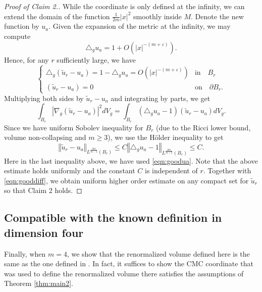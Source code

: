 \documentclass{amsart}
\newcommand{\norm}[1]{\left\Vert#1\right\Vert}
\newcommand{\abs}[1]{\left\vert#1\right\vert}
\numberwithin{equation}{section}
\begin{document}
\begin{proof}
	[Proof of Claim 2.]
	While the coordinate is only defined at the infinity, we can extend the domain of the function $\frac{1}{2m}\abs{x}^2$ smoothly inside $M$. Denote the new function by $u_a$. Given the expansion of the metric at the infinity, we may compute
	\begin{equation}
		\label{eqn:goodua}
		\triangle_g u_a = 1 + O(\abs{x}^{-(m+\varepsilon)}).
	\end{equation}
	Hence, for any $r$ sufficiently large, we have
	\begin{equation}
		\label{eqn:gooddiff}
		\begin{cases}
			\triangle_g (\tilde u_r- u_a) = 1- \triangle_g u_a = O(\abs{x}^{-(m+\varepsilon)}) & \text{in} \quad B_r \\
			(\tilde u_r-u_a) = 0 & \text{on} \quad \partial B_r.
		\end{cases}	
	\end{equation}
	Multiplying both sides by $\tilde{u}_r - u_a$ and integrating by parts, we get
	\[
		\int_{B_r} \abs{\nabla_g (\tilde{u}_r -u_a)}^2 dV_g = \int_{B_r} (\triangle_g u_a-1) (\tilde{u}_r-u_a)dV_g.
	\]
	Since we have uniform Sobolev inequality for $B_r$ (due to the Ricci lower bound, volume non-collapsing and $m\geq 3$), we use the H\"older inequality to get
	\[
		\norm{\tilde{u}_r -u_a}_{L^{\frac{2m}{m-2}}(B_r)} \leq C \norm{\triangle_g u_a-1}_{L^{\frac{2m}{m+2}}(B_r)}\leq C.
	\]
	Here in the last inequality above, we have used \eqref{eqn:goodua}. Note that the above estimate holds uniformly and the constant $C$ is independent of $r$. Together with \eqref{eqn:gooddiff}, we obtain uniform higher order estimate on any compact set for $\tilde{u}_r$ so that Claim 2 holds.
\end{proof}





\subsection{Compatible with the known definition in dimension four}
\label{sub:same}
Finally, when $m=4$, we show that the renormalized volume defined here is the same as the one defined in \cite{biquard2023renormalized}. In fact, it suffices to show the CMC coordinate that was used to define the renormalized volume there satisfies the assumptions of Theorem \ref{thm:main2}.
\end{document}
